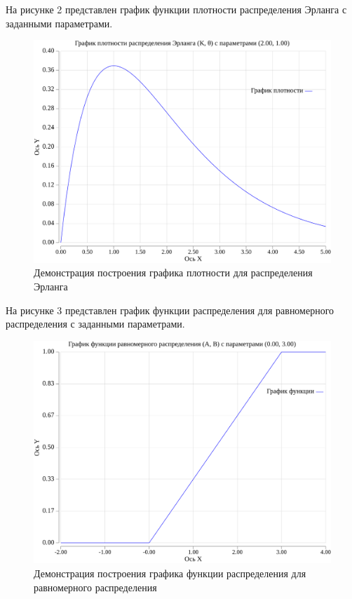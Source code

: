На рисунке 2 представлен график функции плотности распределения Эрланга с заданными параметрами.
\FloatBarrier
\begin{figure}[h]
	\begin{center}
		\includegraphics[width=\linewidth]{inc/erlangProb.png}
	\end{center}
	\caption{Демонстрация построения графика плотности для распределения Эрланга}
\end{figure}
\FloatBarrier

\newpage
На рисунке 3 представлен график функции распределения для равномерного распределения с заданными параметрами.
\FloatBarrier
\begin{figure}[h]
	\begin{center}
		\includegraphics[width=\linewidth]{inc/verFunc.png}
	\end{center}
	\caption{Демонстрация построения графика функции распределения для равномерного распределения}
\end{figure}
\FloatBarrier

